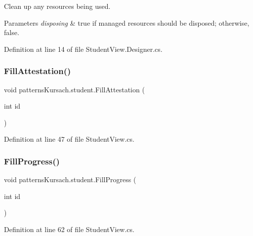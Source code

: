 Clean up any resources being used. 


\begin{DoxyParams}{Parameters}
{\em disposing} & true if managed resources should be disposed; otherwise, false.\\
\hline
\end{DoxyParams}


Definition at line 14 of file Student\+View.\+Designer.\+cs.

\mbox{\label{classpatterns_kursach_1_1student_ade5ff561a25e758c638244eeb3777f4d}} 
\subsubsection{\texorpdfstring{Fill\+Attestation()}{FillAttestation()}}
{\footnotesize\ttfamily void patterns\+Kursach.\+student.\+Fill\+Attestation (\begin{DoxyParamCaption}\item[{int}]{id }\end{DoxyParamCaption})}



Definition at line 47 of file Student\+View.\+cs.

\mbox{\label{classpatterns_kursach_1_1student_ae1bf1deff88ed100f318f8902739abd4}} 
\subsubsection{\texorpdfstring{Fill\+Progress()}{FillProgress()}}
{\footnotesize\ttfamily void patterns\+Kursach.\+student.\+Fill\+Progress (\begin{DoxyParamCaption}\item[{int}]{id }\end{DoxyParamCaption})}



Definition at line 62 of file Student\+View.\+cs.

\mbox{\label{classpatterns_kursach_1_1student_a30dbbf1f0706e7dbac498e79ee42596a}} 
